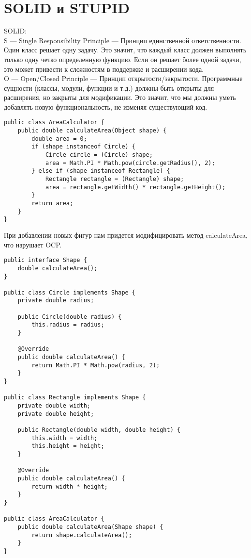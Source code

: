 \section{SOLID и STUPID}
SOLID: \\
S — Single Responsibility Principle — Принцип единственной ответственности. Один класс решает одну задачу. Это значит, что каждый класс должен выполнять только одну четко определенную функцию. Если он решает более одной задачи, это может привести к сложностям в поддержке и расширении кода. \\
\noindent O — Open/Closed Principle — Принцип открытости/закрытости. Программные сущности (классы, модули, функции и т.д.) должны быть открыты для расширения, но закрыты для модификации. Это значит, что мы должны уметь добавлять новую функциональность, не изменяя существующий код.
\begin{lstlisting}
public class AreaCalculator {
    public double calculateArea(Object shape) {
        double area = 0;
        if (shape instanceof Circle) {
            Circle circle = (Circle) shape;
            area = Math.PI * Math.pow(circle.getRadius(), 2);
        } else if (shape instanceof Rectangle) {
            Rectangle rectangle = (Rectangle) shape;
            area = rectangle.getWidth() * rectangle.getHeight();
        }
        return area;
    }
}
\end{lstlisting}
При добавлении новых фигур нам придется модифицировать метод calculateArea, что нарушает OCP. \\
\begin{lstlisting}
public interface Shape {
    double calculateArea();
}

public class Circle implements Shape {
    private double radius;

    public Circle(double radius) {
        this.radius = radius;
    }

    @Override
    public double calculateArea() {
        return Math.PI * Math.pow(radius, 2);
    }
}

public class Rectangle implements Shape {
    private double width;
    private double height;

    public Rectangle(double width, double height) {
        this.width = width;
        this.height = height;
    }

    @Override
    public double calculateArea() {
        return width * height;
    }
}

public class AreaCalculator {
    public double calculateArea(Shape shape) {
        return shape.calculateArea();
    }
}
\end{lstlisting}
